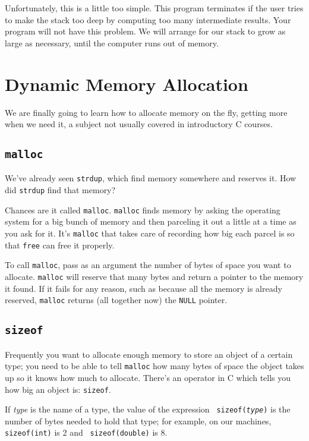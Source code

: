

Unfortunately, this is a little too simple.  This program terminates if
the user tries to make the stack too deep by computing too many
intermediate results.  Your program will not have this problem.  We will
arrange for our stack to grow as large as necessary, until the computer
runs out of memory.

\section{Dynamic Memory Allocation}

We are finally going to learn how to allocate memory on the fly, getting
more when we need it, a subject not usually covered in introductory C
courses.

\subsection{{\tt malloc}}

We've already seen {\tt strdup}, which find memory somewhere and reserves
it.  How did {\tt strdup} find that memory?

Chances are it called {\tt malloc}.  {\tt malloc} finds memory by asking
the operating system for a big bunch of memory and then parceling it
out a little at a time as you ask for it.  It's {\tt malloc} that takes
care of recording how big each parcel is so that {\tt free} can free it
properly.  

To call {\tt malloc}, pass as an argument the number of bytes of space
you want to allocate.  {\tt malloc} will reserve that many bytes and
return a pointer to the memory it found.  If it fails for any reason,
such as because all the memory is already reserved, {\tt malloc} returns
(all together now) the {\tt NULL} pointer.  

\subsection{{\tt sizeof}}

Frequently you want to allocate enough memory to store an object of a
certain type; you need to be able to tell {\tt malloc} how many bytes of
space the object takes up so it knows how much to allocate.  There's an
operator in C which tells you how big an object is: {\tt sizeof}. 

If {\em type} is the name of a type, the value of the expression {\tt
sizeof({\em type}\/)} is the number of bytes needed to hold that type;
for example, on our machines, {\tt sizeof(int)} is 2 and {\tt
sizeof(double)} is 8.  

